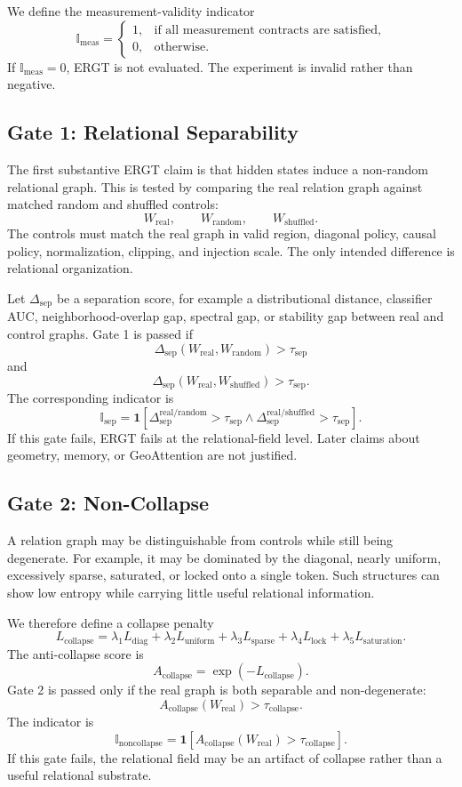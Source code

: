 \documentclass[11pt]{article}
\begin{document}
We define the measurement-validity indicator
\[
\mathbb{I}_{\mathrm{meas}}
=
\begin{cases}
1, & \text{if all measurement contracts are satisfied},\\
0, & \text{otherwise}.
\end{cases}
\]
If $\mathbb{I}_{\mathrm{meas}}=0$, ERGT is not evaluated. The experiment is invalid rather than negative.

\subsection{Gate 1: Relational Separability}

The first substantive ERGT claim is that hidden states induce a non-random relational graph. This is tested by comparing the real relation graph against matched random and shuffled controls:
\[
W_{\mathrm{real}},
\qquad
W_{\mathrm{random}},
\qquad
W_{\mathrm{shuffled}}.
\]
The controls must match the real graph in valid region, diagonal policy, causal policy, normalization, clipping, and injection scale. The only intended difference is relational organization.

Let $\Delta_{\mathrm{sep}}$ be a separation score, for example a distributional distance, classifier AUC, neighborhood-overlap gap, spectral gap, or stability gap between real and control graphs. Gate 1 is passed if
\[
\Delta_{\mathrm{sep}}(W_{\mathrm{real}},W_{\mathrm{random}})>\tau_{\mathrm{sep}}
\]
and
\[
\Delta_{\mathrm{sep}}(W_{\mathrm{real}},W_{\mathrm{shuffled}})>\tau_{\mathrm{sep}}.
\]
The corresponding indicator is
\[
\mathbb{I}_{\mathrm{sep}}
=
\mathbf{1}
\left[
\Delta_{\mathrm{sep}}^{\mathrm{real/random}}>\tau_{\mathrm{sep}}
\land
\Delta_{\mathrm{sep}}^{\mathrm{real/shuffled}}>\tau_{\mathrm{sep}}
\right].
\]
If this gate fails, ERGT fails at the relational-field level. Later claims about geometry, memory, or GeoAttention are not justified.

\subsection{Gate 2: Non-Collapse}

A relation graph may be distinguishable from controls while still being degenerate. For example, it may be dominated by the diagonal, nearly uniform, excessively sparse, saturated, or locked onto a single token. Such structures can show low entropy while carrying little useful relational information.

We therefore define a collapse penalty
\[
L_{\mathrm{collapse}}
=
\lambda_1 L_{\mathrm{diag}}
+
\lambda_2 L_{\mathrm{uniform}}
+
\lambda_3 L_{\mathrm{sparse}}
+
\lambda_4 L_{\mathrm{lock}}
+
\lambda_5 L_{\mathrm{saturation}}.
\]
The anti-collapse score is
\[
A_{\mathrm{collapse}}
=
\exp(-L_{\mathrm{collapse}}).
\]
Gate 2 is passed only if the real graph is both separable and non-degenerate:
\[
A_{\mathrm{collapse}}(W_{\mathrm{real}})>\tau_{\mathrm{collapse}}.
\]
The indicator is
\[
\mathbb{I}_{\mathrm{noncollapse}}
=
\mathbf{1}
\left[
A_{\mathrm{collapse}}(W_{\mathrm{real}})>\tau_{\mathrm{collapse}}
\right].
\]
If this gate fails, the relational field may be an artifact of collapse rather than a useful relational substrate.
\end{document}
